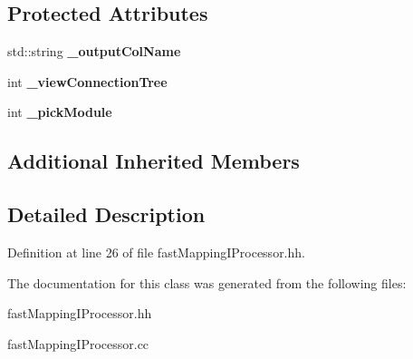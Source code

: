 \subsection*{Protected Attributes}
\begin{DoxyCompactItemize}
\item 
std\-::string {\bfseries \-\_\-output\-Col\-Name}\label{classCALICE_1_1fastMappingIProcessor_a8c3d3a56fa6562d42d5232e1d59793d5}

\item 
int {\bfseries \-\_\-view\-Connection\-Tree}\label{classCALICE_1_1fastMappingIProcessor_a0c9ffa75645122f519a515e0cc9f03c4}

\item 
int {\bfseries \-\_\-pick\-Module}\label{classCALICE_1_1fastMappingIProcessor_a60b71c57578009091da75ae814ac787b}

\end{DoxyCompactItemize}
\subsection*{Additional Inherited Members}


\subsection{Detailed Description}


Definition at line 26 of file fast\-Mapping\-I\-Processor.\-hh.



The documentation for this class was generated from the following files\-:\begin{DoxyCompactItemize}
\item 
fast\-Mapping\-I\-Processor.\-hh\item 
fast\-Mapping\-I\-Processor.\-cc\end{DoxyCompactItemize}
